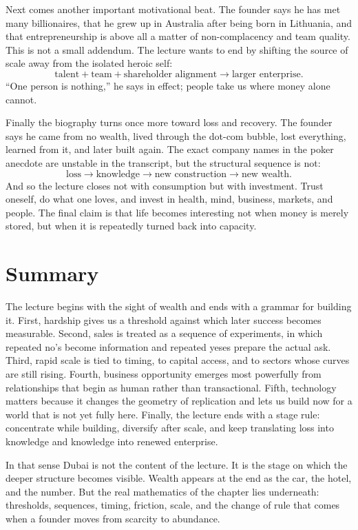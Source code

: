 Next comes another important motivational beat. The founder says he has met many billionaires, that he grew up in Australia after being born in Lithuania, and that entrepreneurship is above all a matter of non-complacency and team quality. This is not a small addendum. The lecture wants to end by shifting the source of scale away from the isolated heroic self:
\begin{equation}
\text{talent} + \text{team} + \text{shareholder alignment} \to \text{larger enterprise}.
\end{equation}
``One person is nothing,'' he says in effect; people take us where money alone cannot.

Finally the biography turns once more toward loss and recovery. The founder says he came from no wealth, lived through the dot-com bubble, lost everything, learned from it, and later built again. The exact company names in the poker anecdote are unstable in the transcript, but the structural sequence is not:
\begin{equation}
\text{loss} \to \text{knowledge} \to \text{new construction} \to \text{new wealth}.
\end{equation}
And so the lecture closes not with consumption but with investment. Trust oneself, do what one loves, and invest in health, mind, business, markets, and people. The final claim is that life becomes interesting not when money is merely stored, but when it is repeatedly turned back into capacity.

\section{Summary}

The lecture begins with the sight of wealth and ends with a grammar for building it. First, hardship gives us a threshold against which later success becomes measurable. Second, sales is treated as a sequence of experiments, in which repeated no's become information and repeated yeses prepare the actual ask. Third, rapid scale is tied to timing, to capital access, and to sectors whose curves are still rising. Fourth, business opportunity emerges most powerfully from relationships that begin as human rather than transactional. Fifth, technology matters because it changes the geometry of replication and lets us build now for a world that is not yet fully here. Finally, the lecture ends with a stage rule: concentrate while building, diversify after scale, and keep translating loss into knowledge and knowledge into renewed enterprise.

In that sense Dubai is not the content of the lecture. It is the stage on which the deeper structure becomes visible. Wealth appears at the end as the car, the hotel, and the number. But the real mathematics of the chapter lies underneath: thresholds, sequences, timing, friction, scale, and the change of rule that comes when a founder moves from scarcity to abundance.